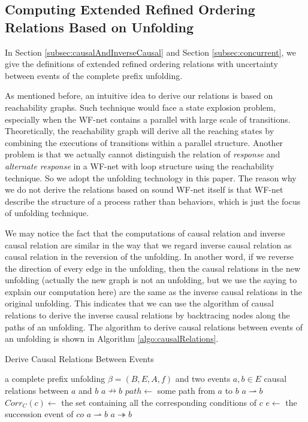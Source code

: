 \documentclass{llncs}
\begin{document}
\subsection{Computing Extended Refined Ordering Relations Based on Unfolding}\label{subsec:computationOfRelations}
In Section \ref{subsec:causalAndInverseCausal} and Section \ref{subsec:concurrent}, we give the definitions of extended refined ordering relations with uncertainty between events of the complete prefix unfolding. 

As mentioned before, an intuitive idea to derive our relations is based on reachability graphs. Such technique would face a state explosion problem, especially when the WF-net contains a parallel with large scale of transitions. Theoretically, the reachability graph will derive all the reaching states by combining the executions of transitions within a parallel structure. Another problem is that we actually cannot distinguish the relation of \textit{response} and \textit{alternate response} in a WF-net with loop structure using the reachability technique. So we adopt the unfolding technology in this paper. The reason why we do not derive the relations based on sound WF-net itself is that WF-net describe the structure of a process rather than behaviors, which is just the focus of unfolding technique.

We may notice the fact that the computations of causal relation and inverse causal relation are similar in the way that we regard inverse causal relation as causal relation in the reversion of the unfolding. In another word, if we reverse the direction of every edge in the unfolding, then the causal relations in the new unfolding (actually the new graph is not an unfolding, but we use the saying to explain our computation here) are the same as the inverse causal relations in the original unfolding. This indicates that we can use the algorithm of causal relations to derive the inverse causal relations by backtracing nodes along the paths of an unfolding. The algorithm to derive causal relations between events of an unfolding is shown in Algorithm \ref{algo:causalRelations}. 

\begin{algorithm}
\caption{Derive Causal Relations Between Events}
\label{algo:causalRelations}
	\begin{algorithmic}
		\Require a complete prefix unfolding $\beta=(B,E,A,f)$ and two events $a,b\in E$
		\Ensure causal relations between $a$ and $b$
			\State \Return $a\nrightarrow b$
		\EndIf
		\State $path\gets$ some path from $a$ to $b$
			\State \Return $a\rightharpoonup b$
		\Else
				\State $Corr_{C}(c)\gets$ the set containing all the corresponding conditions of $c$
					\State $e\gets$ the succession event of $co$
						\State \Return $a\rightharpoonup b$
					\EndIf
				\EndFor
			\EndFor
		\EndIf
		\State \Return $a\twoheadrightarrow b$
	\end{algorithmic}
\end{algorithm}
\end{document}

